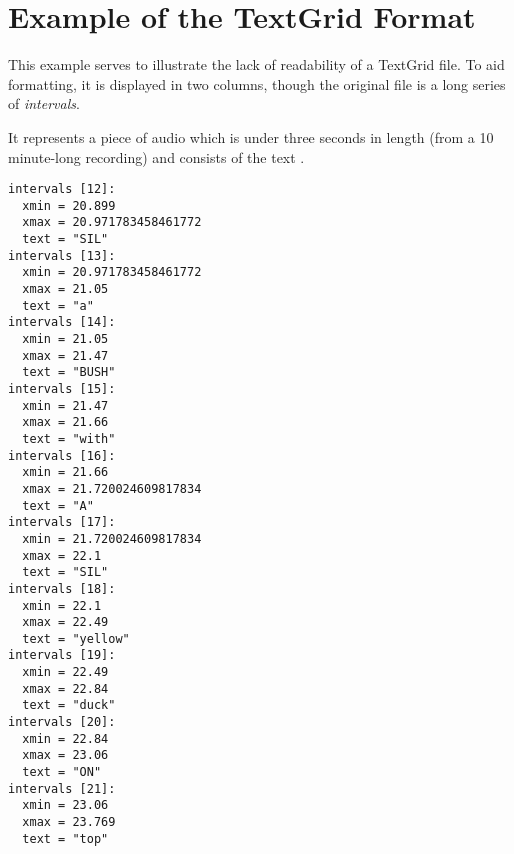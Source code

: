 \label{appendix:textgrid}
\chapter{Example of the TextGrid Format}

This example serves to illustrate the lack of readability of a TextGrid file.
To aid formatting, it is displayed in two columns, though the original file is a long series of \emph{intervals}.

It represents a piece of audio which is under three seconds in length (from a 10 minute-long recording) and consists of the text .

\begin{multicols}{2}
\begin{verbatim}
intervals [12]:
  xmin = 20.899 
  xmax = 20.971783458461772 
  text = "SIL" 
intervals [13]:
  xmin = 20.971783458461772 
  xmax = 21.05 
  text = "a" 
intervals [14]:
  xmin = 21.05 
  xmax = 21.47 
  text = "BUSH" 
intervals [15]:
  xmin = 21.47 
  xmax = 21.66 
  text = "with" 
intervals [16]:
  xmin = 21.66 
  xmax = 21.720024609817834 
  text = "A" 
intervals [17]:
  xmin = 21.720024609817834 
  xmax = 22.1 
  text = "SIL" 
intervals [18]:
  xmin = 22.1 
  xmax = 22.49 
  text = "yellow" 
intervals [19]:
  xmin = 22.49 
  xmax = 22.84 
  text = "duck" 
intervals [20]:
  xmin = 22.84 
  xmax = 23.06 
  text = "ON" 
intervals [21]:
  xmin = 23.06 
  xmax = 23.769 
  text = "top"
\end{verbatim}
\end{multicols}
